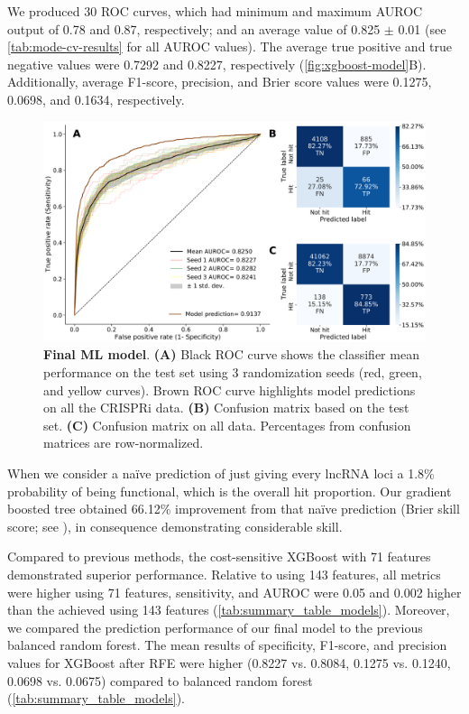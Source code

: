 We produced 30 ROC curves, which had minimum and maximum AUROC output of 0.78 and 0.87, respectively; and an average value of 0.825 $\pm$ 0.01 (see \autoref{tab:mode-cv-results} for all AUROC values). The average true positive and true negative values were 0.7292 and 0.8227, respectively (\autoref{fig:xgboost-model}B). Additionally, average F1-score, precision, and Brier score values were 0.1275, 0.0698, and 0.1634, respectively.   

\begin{figure}[ht!]
  \centering
  \includegraphics[scale=0.35]{plots/results/ml/cost.sensitive.xgboost.rfe.71.feat.v2.pdf}
  \caption[Final ML model]{\textbf{Final ML model}. \textbf{(A)} Black ROC curve shows the classifier mean performance on the test set using 3 randomization seeds (red, green, and yellow curves). Brown ROC curve highlights model predictions on all the CRISPRi data. \textbf{(B)} Confusion matrix based on the test set. \textbf{(C)} Confusion matrix on all data. Percentages from confusion matrices are row-normalized.}
  \label{fig:xgboost-model}
\end{figure}

When we consider a na\"ive prediction of just giving every lncRNA loci a 1.8\% probability of being functional, which is the overall hit proportion. Our gradient boosted tree obtained 66.12\% improvement from that na\"ive prediction (Brier skill score; see ), in consequence demonstrating considerable skill. 

Compared to previous methods, the cost-sensitive XGBoost with 71 features demonstrated superior performance. Relative to using 143 features, all metrics were higher using 71 features, sensitivity, and AUROC were 0.05 and 0.002 higher than the achieved using 143 features (\autoref{tab:summary_table_models}). Moreover, we compared the prediction performance of our final model to the previous balanced random forest. The mean results of specificity, F1-score, and precision values for XGBoost after RFE were higher (0.8227 vs. 0.8084, 0.1275 vs. 0.1240, 0.0698 vs. 0.0675) compared to balanced random forest (\autoref{tab:summary_table_models}). 


